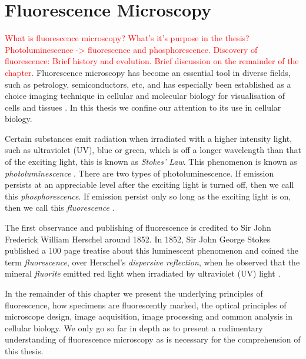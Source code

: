 
\chapter{Fluorescence Microscopy} %

\label{chap:Chapter2} %
\textcolor{red}{What is fluorescence microscopy? What's it's purpose in the thesis?	Photoluminescence -> fluorescence and phosphorescence. Discovery of fluorescence: Brief history and evolution. Brief discussion on the remainder of the chapter.}
Fluorescence microscopy has become an essential tool in diverse fields, such as petrology, semiconductors, etc, and has especially been established as a choice imaging technique in cellular and molecular biology for visualisation of cells and tissues \citep{Spring2003,Danek2012,Hubeny2008,Fatima2008,Matula2012}.
In this thesis we confine our attention to its use in cellular biology.

Certain substances emit radiation when irradiated with a higher intensity light, such as ultraviolet (UV), blue or green, which is off a longer wavelength than that of the exciting light, this is known as \textit{Stokes' Law}.
This phenomenon is known as \textit{photoluminescence} \citep{Koch1972,Vaughan2015,Sarder2006,AbramowitzDavidson2016}.
There are two types of photoluminescence. If emission persists at an appreciable level after the exciting light is turned off, then we call this \textit{phosphorescence}.
If emission persist only so long as the exciting light is on, then we call this \textit{fluorescence} \citep{Koch1972,SpringDavisdson2016}.

The first observance and publishing of fluorescence is credited to Sir John Frederick William Herschel around 1852.
In 1852, Sir John George Stokes published a 100 page treatise about this luminescent phenomenon and coined the term \textit{fluorescence}, over Herschel's \textit{dispersive reflection}, when he observed that the mineral \textit{fluorite} emitted red light when irradiated by ultraviolet (UV) light \citep{Dobrucki2013,Danek2012}.

In the remainder of this chapter we present the underlying principles of fluorescence, how specimens are fluorescently marked, the optical principles of microscope design, image acquisition, image processing and common analysis in cellular biology.
We only go so far in depth as to present a rudimentary understanding of fluorescence microscopy as is necessary for the comprehension of this thesis.

